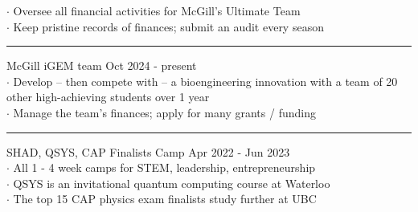 \documentclass[12pt, letterpaper]{article}
\begin{document}
{\begin{minipage}[t]{0.6\linewidth}
$\cdot$ Oversee all financial activities for McGill's Ultimate Team\\
$\cdot$ Keep pristine records of finances; submit an audit every season
\vspace{0.3\baselineskip}\hrule\vspace{0.3\baselineskip}
\large McGill iGEM team \hfill \footnotesize Oct 2024 - present \\
\normalsize
$\cdot$ Develop -- then compete with -- a bioengineering innovation with a team of 20 other high-achieving students over 1 year \\
$\cdot$ Manage the team's finances; apply for many grants / funding
\vspace{0.3\baselineskip}\hrule\vspace{0.3\baselineskip}
\large SHAD, QSYS, CAP Finalists Camp \hfill \footnotesize Apr 2022 - Jun 2023 \\
\normalsize
$\cdot$ All 1 - 4 week camps for STEM, leadership, entrepreneurship\\
$\cdot$ QSYS is an invitational quantum computing course at Waterloo \\
$\cdot$ The top 15 CAP physics exam finalists study further at UBC


\end{minipage}}
\end{document}
